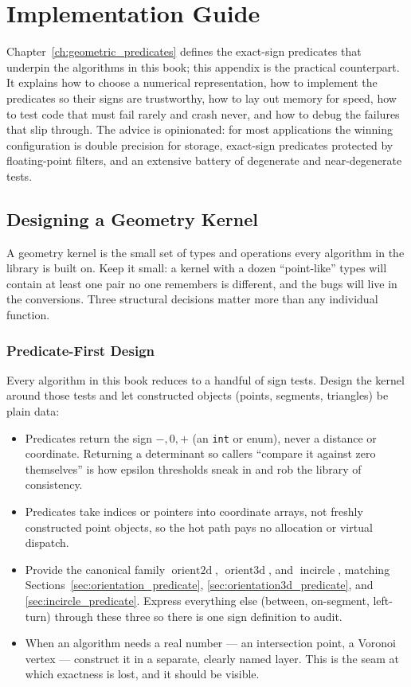 \chapter{Implementation Guide}
\label{app:implementation_guide}
Chapter~\ref{ch:geometric_predicates} defines the exact-sign predicates that
underpin the algorithms in this book; this appendix is the practical
counterpart. It explains how to choose a numerical representation, how to
implement the predicates so their signs are trustworthy, how to lay out
memory for speed, how to test code that must fail rarely and crash never,
and how to debug the failures that slip through. The advice is opinionated:
for most applications the winning configuration is double precision for
storage, exact-sign predicates protected by floating-point filters, and an
extensive battery of degenerate and near-degenerate tests.
\section{Designing a Geometry Kernel}
\label{sec:app_impl_kernel}
A geometry kernel is the small set of types and
operations every algorithm in the library is built on. Keep it small: a
kernel with a dozen ``point-like'' types will contain at least one pair no
one remembers is different, and the bugs will live in the conversions. Three
structural decisions matter more than any individual function.
\subsection{Predicate-First Design}
\label{sec:appimpl_predicate_first}
Every algorithm in this book reduces to a handful of sign tests. Design the
kernel around those tests and let constructed objects (points, segments,
triangles) be plain data:

\begin{itemize}
  \item Predicates return the sign $-,0,+$ (an \texttt{int} or enum), never
        a distance or coordinate. Returning a determinant so callers
        ``compare it against zero themselves'' is how epsilon thresholds
        sneak in and rob the library of consistency.
  \item Predicates take indices or pointers into coordinate arrays, not
        freshly constructed point objects, so the hot path pays no
        allocation or virtual dispatch.
  \item Provide the canonical family $\operatorname{orient2d}$,
        $\operatorname{orient3d}$, and $\operatorname{incircle}$, matching
        Sections~\ref{sec:orientation_predicate},
        \ref{sec:orientation3d_predicate}, and \ref{sec:incircle_predicate}.
        Express everything else (between, on-segment, left-turn) through
        these three so there is one sign definition to audit.
  \item When an algorithm needs a real number --- an intersection point, a
        Voronoi vertex --- construct it in a separate, clearly named layer.
        This is the seam at which exactness is lost, and it should be
        visible.
\end{itemize}
